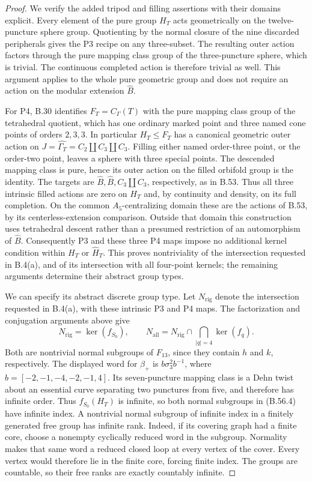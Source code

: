 \begin{proof}
We verify the added tripod and filling assertions with their
domains explicit.  Every element of the pure group $H_T$
acts geometrically on the twelve-puncture sphere group.
Quotienting by the normal closure of the nine discarded
peripherals gives the P3 recipe on any three-subset.
The resulting outer action factors through the pure mapping
class group of the three-puncture sphere, which is trivial.
The continuous completed action is therefore trivial as well.
This argument applies to the whole pure geometric group and
does not require an action on the modular extension
$\widehat B$.

For P4, B.30 identifies $F_T=C_\Gamma(T)$ with the pure
mapping class group of the tetrahedral quotient, which has
one ordinary marked point and three named cone points of
orders $2,3,3$.  In particular $H_T\leq F_T$ has a canonical
geometric outer action on
$J=\widehat{\Gamma_T}=C_2\amalg C_3\amalg C_3$.
Filling either named order-three point, or the order-two
point, leaves a sphere with three special points.
The descended mapping class is pure, hence its outer action
on the filled orbifold group is the identity.  The targets
are $\widehat B,\widehat B,C_3\amalg C_3$, respectively,
as in B.53.  Thus all three intrinsic filled actions are
zero on $H_T$ and, by continuity and density, on its full
completion.  On the common $A_5$-centralizing domain these
are the actions of B.53, by its centerless-extension
comparison.  Outside that domain this construction uses
tetrahedral descent rather than a presumed restriction of
an automorphism of $\widehat B$.
Consequently P3 and these three P4 maps impose no additional
kernel condition within $H_T$ or $\widehat H_T$.
This proves nontriviality of the intersection requested in
B.4(a), and of its intersection with all four-point kernels;
the remaining arguments determine their abstract group types.

We can specify its abstract discrete group type.
Let $N_{\mathrm{rig}}$ denote the intersection requested in
B.4(a), with these intrinsic P3 and P4 maps.
The factorization and conjugation arguments above give
\[
 N_{\mathrm{rig}}=\ker(f_{S_0}),\qquad
 N_{\mathrm{all}}=N_{\mathrm{rig}}\cap
                  \bigcap_{|q|=4}\ker(f_q).
 \tag{B.56.4}
\]
Both are nontrivial normal subgroups of $F_{13}$, since
they contain $h$ and $k$, respectively.
The displayed word for $\beta_+$ is
$b\sigma_3^2b^{-1}$, where
$b=[-2,-1,-4,-2,-1,4]$.
Its seven-puncture mapping class is a Dehn twist about an
essential curve separating two punctures from five,
and therefore has infinite order.
Thus $f_{S_0}(H_T)$ is infinite, so both normal subgroups
in (B.56.4) have infinite index.
A nontrivial normal subgroup of infinite index in a
finitely generated free group has infinite rank.
Indeed, if its covering graph had a finite core, choose
a nonempty cyclically reduced word in the subgroup.
Normality makes that same word a reduced closed loop
at every vertex of the cover.  Every vertex would
therefore lie in the finite core, forcing finite index.
The groups are countable, so their free ranks are
exactly countably infinite.


\end{proof}
